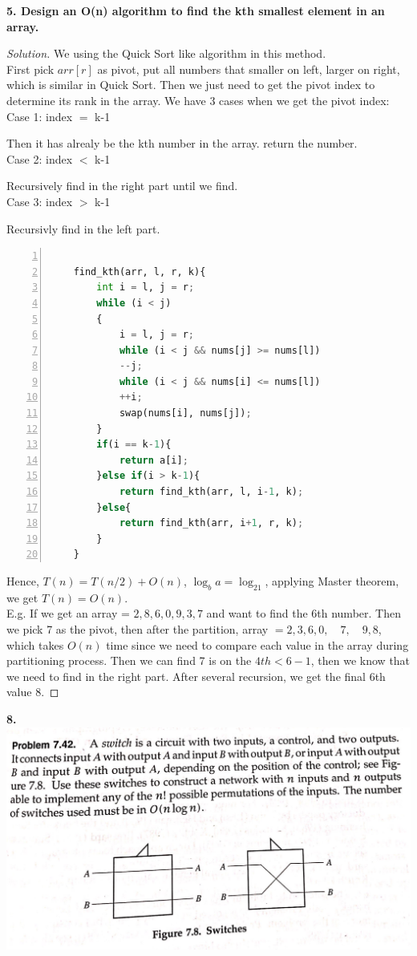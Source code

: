 \documentclass[12pt]{article}
\begin{document}
\textbf{5. Design an O(n) algorithm to find the kth smallest element in an array.}
\begin{proof}[Solution]
	We using the Quick Sort like algorithm in this method.\\
	First pick $arr[r]$ as pivot, put all numbers that smaller on left, larger on right, which is similar in Quick Sort. Then we just need to get the pivot index to determine its rank in the array. We have 3 cases when we get the pivot index:\\
	Case 1: index $=$ k-1
	
	Then it has alrealy be the kth number in the array. return the number.\\
	Case 2: index $<$ k-1
	
	Recursively find in the right part until we find.\\
	Case 3: index $>$ k-1
	
	Recursivly find in the left part.
	\begin{lstlisting}[language={python},numbers=left,numberstyle=\tiny,%frame=shadowbox,  
		rulesepcolor=\color{red!20!green!20!blue!20},  
		keywordstyle=\color{blue!70!black},  
		commentstyle=\color{blue!90!},  
		basicstyle=\ttfamily]  
		
	find_kth(arr, l, r, k){
		int i = l, j = r;
		while (i < j)
		{
			i = l, j = r;
			while (i < j && nums[j] >= nums[l])
			--j;
			while (i < j && nums[i] <= nums[l])
			++i;
			swap(nums[i], nums[j]);
		}
		if(i == k-1){
			return a[i];
		}else if(i > k-1){
			return find_kth(arr, l, i-1, k);
		}else{
			return find_kth(arr, i+1, r, k);
		}
	}
	\end{lstlisting}
	Hence, $T(n) = T(n/2) + O(n)$, $\log_ba=\log_21$, applying Master theorem, we get $T(n)=O(n)$.\\
	
	E.g. If we get an array = ${2,8,6,0,9,3,7}$ and want to find the 6th number. Then we pick 7 as the pivot, then after the partition, array $= {2,3,6,0,\quad 7,\quad  9,8}$, which takes $O(n)$ time since we need to compare each value in the array during partitioning process. Then we can find 7 is on the $4th < 6-1$, then we know that we need to find in the right part. After several recursion, we get the final 6th value 8.
\end{proof}
\textbf{8.}\\
\includegraphics[scale=0.35]{8.png}
\end{document}
